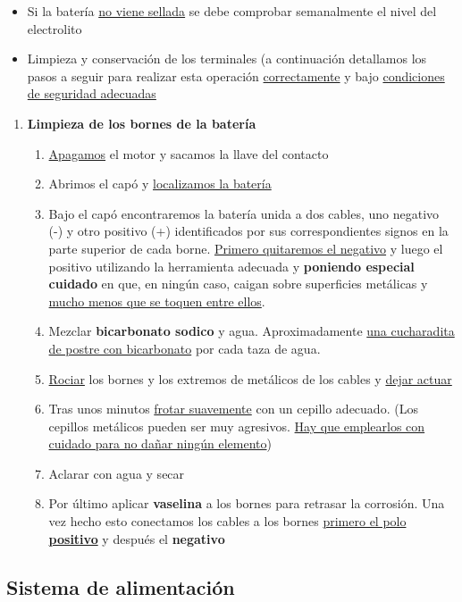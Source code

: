 \documentclass[a4paper,12pt,oneside]{book}
\begin{document}
\begin{itemize}
\item Si la batería \uline{no viene sellada} se debe comprobar semanalmente el nivel del electrolito
\item Limpieza y conservación de los terminales (a continuación detallamos los pasos
a seguir para realizar esta operación \uline{correctamente} y bajo \uline{condiciones de 
seguridad adecuadas}
\end{itemize}

\begin{enumerate}
\item \textbf{Limpieza de los bornes de la batería}
\label{sec:orgef30056}
\begin{enumerate}
\item \uline{Apagamos} el motor y sacamos la llave del contacto
\item Abrimos el capó y \uline{localizamos la batería}
\item Bajo el capó encontraremos la batería unida a dos cables, uno negativo (-) y
otro positivo (+) identificados por sus correspondientes signos en la  parte
superior de cada borne. \uline{Primero quitaremos el negativo} y luego el  positivo
utilizando la herramienta adecuada y \textbf{poniendo especial cuidado} en que, en
ningún caso, caigan sobre superficies metálicas y \uline{mucho menos que se toquen
entre ellos}.
\item Mezclar \textbf{bicarbonato sodico} y agua. Aproximadamente \uline{una cucharadita de 
postre con bicarbonato} por cada taza de agua.
\item \uline{Rociar} los bornes y los extremos de metálicos de los cables y \uline{dejar
actuar}
\item Tras unos minutos \uline{frotar suavemente} con un cepillo adecuado. (Los cepillos
metálicos pueden ser muy agresivos. \uline{Hay que emplearlos con cuidado para no 
dañar ningún elemento})
\item Aclarar con agua y secar
\item Por último aplicar \textbf{vaselina} a los bornes para retrasar la corrosión. Una
vez hecho esto conectamos los cables a los bornes \uline{primero el polo \textbf{positivo}}
y después el \textbf{negativo}
\end{enumerate}
\end{enumerate}

\subsection{Sistema de alimentación}
\label{sec:orga6ea232}
\end{document}
